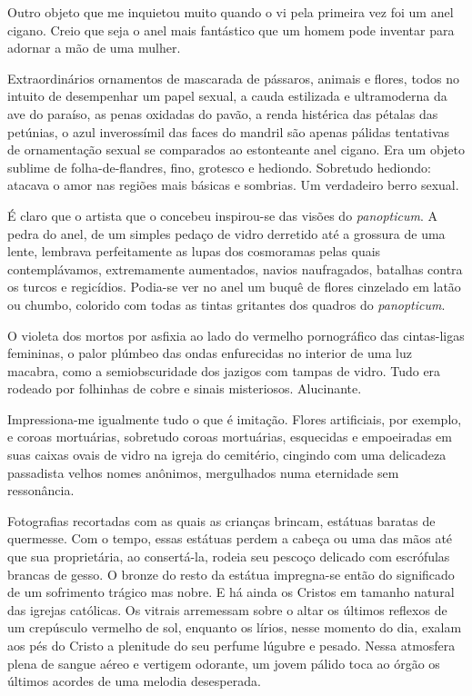 Outro objeto que me inquietou muito quando o vi pela primeira vez foi um anel cigano. Creio que seja o anel mais fantástico que um homem pode inventar para adornar a mão de uma mulher.

Extraordinários ornamentos de mascarada de pássaros, animais e flores, todos no intuito de desempenhar um papel sexual, a cauda estilizada e ultramoderna da ave do paraíso, as penas oxidadas do pavão, a renda histérica das pétalas das petúnias, o azul inverossímil das faces do mandril são apenas pálidas tentativas de ornamentação sexual se comparados ao estonteante anel cigano. Era um objeto sublime de folha-de-flandres, fino, grotesco e hediondo. Sobretudo hediondo: atacava o amor nas regiões mais básicas e sombrias. Um verdadeiro berro sexual.

É claro que o artista que o concebeu inspirou-se das visões do \textit{panopticum}. A pedra do anel, de um simples pedaço de vidro derretido até a grossura de uma lente, lembrava perfeitamente as lupas dos cosmoramas pelas quais contemplávamos, extremamente aumentados, navios naufragados, batalhas contra os turcos e regicídios. Podia-se ver no anel um buquê de flores cinzelado em latão ou chumbo, colorido com todas as tintas gritantes dos quadros do \textit{panopticum}.

O violeta dos mortos por asfixia ao lado do vermelho pornográfico das cintas-ligas femininas, o palor plúmbeo das ondas enfurecidas no interior de uma luz macabra, como a semiobscuridade dos jazigos com tampas de vidro. Tudo era rodeado por folhinhas de cobre e sinais misteriosos. Alucinante.

Impressiona-me igualmente tudo o que é imitação. Flores artificiais, por exemplo, e coroas mortuárias, sobretudo coroas mortuárias, esquecidas e empoeiradas em suas caixas ovais de vidro na igreja do cemitério, cingindo com uma delicadeza passadista velhos nomes anônimos, mergulhados numa eternidade sem ressonância.

Fotografias recortadas com as quais as crianças brincam, estátuas baratas de quermesse. Com o tempo, essas estátuas perdem a cabeça ou uma das mãos até que sua proprietária, ao consertá-la, rodeia seu pescoço delicado com escrófulas brancas de gesso. O bronze do resto da estátua impregna-se então do significado de um sofrimento trágico mas nobre. E há ainda os Cristos em tamanho natural das igrejas católicas. Os vitrais arremessam sobre o altar os últimos reflexos de um crepúsculo vermelho de sol, enquanto os lírios, nesse momento do dia, exalam aos pés do Cristo a plenitude do seu perfume lúgubre e pesado. Nessa atmosfera plena de sangue aéreo e vertigem odorante, um jovem pálido toca ao órgão os últimos acordes de uma melodia desesperada.

